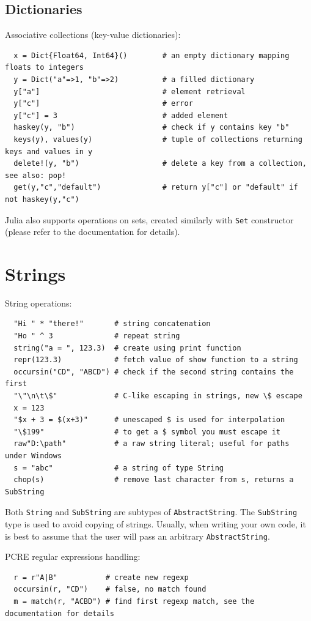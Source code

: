 \documentclass[10pt,a4paper]{article}
\begin{document}
\subsection{Dictionaries}
Associative collections (key-value dictionaries):
\begin{lstlisting}
  x = Dict{Float64, Int64}()        # an empty dictionary mapping floats to integers
  y = Dict("a"=>1, "b"=>2)          # a filled dictionary
  y["a"]                            # element retrieval
  y["c"]                            # error
  y["c"] = 3                        # added element
  haskey(y, "b")                    # check if y contains key "b"
  keys(y), values(y)                # tuple of collections returning keys and values in y
  delete!(y, "b")                   # delete a key from a collection, see also: pop!
  get(y,"c","default")              # return y["c"] or "default" if not haskey(y,"c")
\end{lstlisting}
Julia also supports operations on sets, created similarly with \lstinline|Set|
constructor (please refer to the documentation for details).

\section{Strings}
String operations:
\begin{lstlisting}
  "Hi " * "there!"       # string concatenation
  "Ho " ^ 3              # repeat string
  string("a = ", 123.3)  # create using print function
  repr(123.3)            # fetch value of show function to a string
  occursin("CD", "ABCD") # check if the second string contains the first
  "\"\n\t\$"             # C-like escaping in strings, new \$ escape
  x = 123
  "$x + 3 = $(x+3)"      # unescaped $ is used for interpolation
  "\$199"                # to get a $ symbol you must escape it
  raw"D:\path"           # a raw string literal; useful for paths under Windows
  s = "abc"              # a string of type String
  chop(s)                # remove last character from s, returns a SubString
\end{lstlisting}

Both \lstinline|String| and \lstinline|SubString| are subtypes of
\lstinline|AbstractString|. The  \lstinline|SubString| type is used to avoid
copying of strings. Usually, when writing your own code, it is best to assume
that the user will pass an arbitrary \lstinline|AbstractString|.

PCRE regular expressions handling:
\begin{lstlisting}
  r = r"A|B"           # create new regexp
  occursin(r, "CD")    # false, no match found
  m = match(r, "ACBD") # find first regexp match, see the documentation for details
\end{lstlisting}
\end{document}
